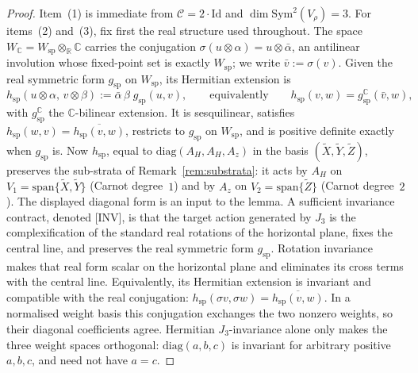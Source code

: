 \documentclass[11pt,a4paper]{article}
\newcommand{\Vr}{V_\rho}
\newcommand{\Sym}{\mathrm{Sym}}
\begin{document}
    \begin{proof}
      Item~(1) is immediate from $\mathcal{C} = 2 \cdot \mathrm{Id}$ and $\dim \Sym^2(\Vr) = 3$.
      For items~(2) and~(3), fix first the real structure used throughout.
      The space $W_\mathbb{C} = W_{\mathrm{sp}} \otimes_\mathbb{R} \mathbb{C}$ carries the
      conjugation $\sigma(u \otimes \alpha) = u \otimes \bar\alpha$, an antilinear involution
      whose fixed-point set is exactly $W_{\mathrm{sp}}$; we write $\bar v := \sigma(v)$.
      Given the real symmetric form $g_{\mathrm{sp}}$ on $W_{\mathrm{sp}}$, its Hermitian extension
      is
      \begin{equation}
        \label{eq:herm}
        h_{\mathrm{sp}}(u \otimes \alpha,\, v \otimes \beta)
          := \bar\alpha\,\beta\; g_{\mathrm{sp}}(u, v),
        \qquad\text{equivalently}\qquad
        h_{\mathrm{sp}}(v, w) = g_{\mathrm{sp}}^{\mathbb{C}}(\bar v, w),
      \end{equation}
      with $g_{\mathrm{sp}}^{\mathbb{C}}$ the $\mathbb{C}$-bilinear extension.
      It is sesquilinear, satisfies $h_{\mathrm{sp}}(w,v) = \overline{h_{\mathrm{sp}}(v,w)}$,
      restricts to $g_{\mathrm{sp}}$ on $W_{\mathrm{sp}}$, and is positive definite exactly when
      $g_{\mathrm{sp}}$ is.
      Now $h_{\mathrm{sp}}$, equal to $\mathrm{diag}(A_H, A_H, A_z)$
      in the basis $(\tilde X, \tilde Y, \tilde Z)$, preserves the sub-strata of
      Remark~\ref{rem:substrata}:
      it acts by $A_H$ on $V_1 = \mathrm{span}\{\tilde X, \tilde Y\}$ (Carnot degree~$1$) and by $A_z$
      on $V_2 = \mathrm{span}\{\tilde Z\}$ (Carnot degree~$2$).
      The displayed diagonal form is an input to the lemma.
      A sufficient invariance contract, denoted [INV], is that the target action generated by
      $J_3$ is the complexification of the standard real rotations of the horizontal plane,
      fixes the central line, and preserves the real symmetric form $g_{\mathrm{sp}}$.
      Rotation invariance makes that real form scalar on the horizontal plane and eliminates
      its cross terms with the central line.
      Equivalently, its Hermitian extension is invariant and compatible with the real
      conjugation: $h_{\mathrm{sp}}(\sigma v,\sigma w)=\overline{h_{\mathrm{sp}}(v,w)}$.
      In a normalised weight basis this conjugation exchanges the two nonzero weights, so their
      diagonal coefficients agree.
      Hermitian $J_3$-invariance alone only makes the three weight spaces orthogonal:
      $\mathrm{diag}(a,b,c)$ is invariant for arbitrary positive $a,b,c$, and need not have $a=c$.

\end{proof}
\end{document}

